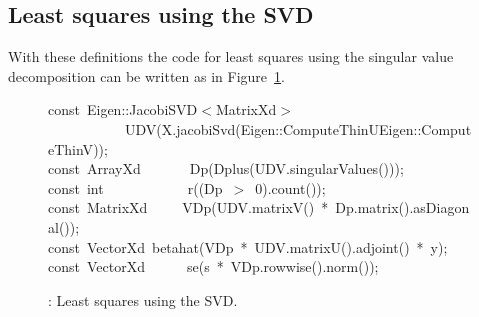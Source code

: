 \documentclass[shortnames,article,nojss]{jss}
\newcommand{\hlstd}[1]{\textcolor[rgb]{0,0,0}{#1}}
\newcommand{\hlnum}[1]{\textcolor[rgb]{0,0,0}{#1}}
\newcommand{\hlopt}[1]{\textcolor[rgb]{0,0,0}{#1}}
\newcommand{\hlkwb}[1]{\textcolor[rgb]{0.13,0.54,0.13}{#1}}
\newcommand{\hlkwd}[1]{\textcolor[rgb]{0,0,0}{#1}}
\begin{document}
\subsection{Least squares using the SVD}
\label{sec:SVDls}

With these definitions the code for least squares using the singular
value decomposition can be written as in Figure~\ref{SVDLS}.
\begin{figure}[htb]
    \noindent
    \ttfamily
    \hlkwb{const\ }\hlstd{Eigen}\hlopt{::}\hlstd{JacobiSVD}\hlopt{$<$}\hlstd{MatrixXd}\hlopt{$>$}\hspace*{\fill}\\
    \hlstd{}\hlstd{\ \ \ \ \ \ \ \ \ \ \ }\hlstd{}\hlkwd{UDV}\hlstd{}\hlopt{(}\hlstd{X}\hlopt{.}\hlstd{}\hlkwd{jacobiSvd}\hlstd{}\hlopt{(}\hlstd{Eigen}\hlopt{::}\hlstd{ComputeThinU}\hlopt{\textbar }\hlstd{Eigen}\hlopt{::}\hlstd{ComputeThinV}\hlopt{));}\hspace*{\fill}\\
    \hlstd{}\hlkwb{const\ }\hlstd{ArrayXd}\hlstd{\ \ \ \ \ \ \ }\hlstd{}\hlkwd{Dp}\hlstd{}\hlopt{(}\hlstd{}\hlkwd{Dplus}\hlstd{}\hlopt{(}\hlstd{UDV}\hlopt{.}\hlstd{}\hlkwd{singularValues}\hlstd{}\hlopt{()));}\hspace*{\fill}\\
    \hlstd{}\hlkwb{const\ int}\hlstd{\ \ \ \ \ \ \ \ \ \ \ \ }\hlkwb{}\hlstd{}\hlkwd{r}\hlstd{}\hlopt{((}\hlstd{Dp\ }\hlopt{$>$\ }\hlstd{}\hlnum{0}\hlstd{}\hlopt{).}\hlstd{}\hlkwd{count}\hlstd{}\hlopt{());}\hspace*{\fill}\\
    \hlstd{}\hlkwb{const\ }\hlstd{MatrixXd}\hlstd{\ \ \ \ \ }\hlstd{}\hlkwd{VDp}\hlstd{}\hlopt{(}\hlstd{UDV}\hlopt{.}\hlstd{}\hlkwd{matrixV}\hlstd{}\hlopt{()\ {*}\ }\hlstd{Dp}\hlopt{.}\hlstd{}\hlkwd{matrix}\hlstd{}\hlopt{().}\hlstd{}\hlkwd{asDiagonal}\hlstd{}\hlopt{());}\hspace*{\fill}\\
    \hlstd{}\hlkwb{const\ }\hlstd{VectorXd\ }\hlkwd{betahat}\hlstd{}\hlopt{(}\hlstd{VDp\ }\hlopt{{*}\ }\hlstd{UDV}\hlopt{.}\hlstd{}\hlkwd{matrixU}\hlstd{}\hlopt{().}\hlstd{}\hlkwd{adjoint}\hlstd{}\hlopt{()\ {*}\ }\hlstd{y}\hlopt{);}\hspace*{\fill}\\
    \hlstd{}\hlkwb{const\ }\hlstd{VectorXd}\hlstd{\ \ \ \ \ \ }\hlstd{}\hlkwd{se}\hlstd{}\hlopt{(}\hlstd{s\ }\hlopt{{*}\ }\hlstd{VDp}\hlopt{.}\hlstd{}\hlkwd{rowwise}\hlstd{}\hlopt{().}\hlstd{}\hlkwd{norm}\hlstd{}\hlopt{());}\hlstd{}\hspace*{\fill}\\
    \mbox{}
    \normalfont
    \normalsize
  \caption{: Least squares using the SVD.}
  \label{SVDLS}
\end{figure}
\end{document}
